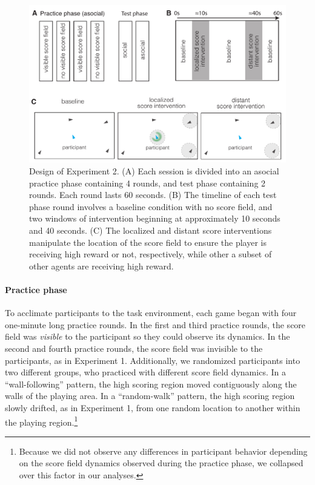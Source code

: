 \documentclass[12pt,letterpaper]{article}
\begin{document}
\begin{figure}[t!]
  \centering
  \includegraphics[width=1\textwidth]{./figures/exp2_design.pdf}
  \caption{Design of Experiment 2. (A) Each session is divided into an asocial practice phase containing 4 rounds, and test phase containing 2 rounds. Each round lasts 60 seconds. (B) The timeline of each test phase round involves a baseline condition with no score field, and two windows of intervention beginning at approximately 10 seconds and 40 seconds. (C) The localized and distant score interventions manipulate the location of the score field to ensure the player is receiving high reward or not, respectively, while other a subset of other agents are receiving high reward.}
  \label{fig:exp2_design}
\end{figure}


\paragraph{Practice phase}

To acclimate participants to the task environment, each game began with four one-minute long practice rounds. 
In the first and third practice rounds, the score field was \emph{visible} to the participant so they could observe its dynamics.
In the second and fourth practice rounds, the score field was invisible to the participants, as in Experiment 1. 
Additionally, we randomized participants into two different groups, who practiced with different score field dynamics. 
In a ``wall-following'' pattern, the high scoring region moved contiguously along the walls of the playing area. 
In a ``random-walk'' pattern, the high scoring region slowly drifted, as in Experiment 1, from one random location to another within the playing region.\footnote{Because we did not observe any differences in participant behavior depending on the score field dynamics observed during the practice phase, we collapsed over this factor in our analyses.}
\end{document}
